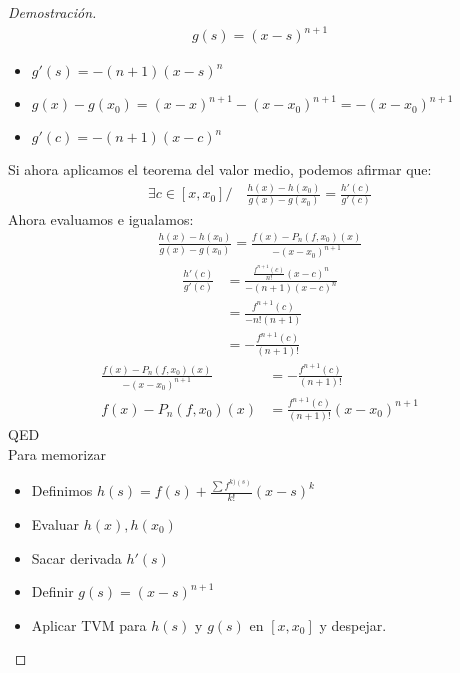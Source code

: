 \documentclass{article}
\begin{document}
\begin{proof}[Demostración]
    \begin{equation}
        \begin{split}
            g(s)= (x-s)^{n+1}
        \end{split}
    \end{equation}
    \begin{itemize}
        \item $g'(s)=-(n+1)(x-s)^{n}$
        \item $g(x) -g(x_{0})= (x-x)^{n+1} - (x-x_{0})^{n+1}= - (x-x_{0})^{n+1}$
        \item $g'(c)= -(n+1)(x-c)^{n}$
    \end{itemize}
    Si ahora aplicamos el teorema del valor medio, podemos afirmar que:
    \begin{equation}
        \begin{split}
            \exists c \in [x,x_{0}] / \quad \frac{h(x)-h(x_{0})}{g(x)-g(x_{0})} = \frac{h'(c)}{g'(c)}
        \end{split}
    \end{equation}
    Ahora evaluamos e igualamos:
    \begin{equation}
        \begin{split}
            \frac{h(x)-h(x_{0})}{g(x)-g(x_{0})} = \frac{f(x)- P_{n}(f,x_{0})(x)}{-(x-x_{0})^{n+1}}
        \end{split}
    \end{equation}
    \begin{equation}
        \begin{split}
            \frac{h'(c)}{g'(c)} &= \frac{\frac{f^{n+1}(c)}{n!}(x-c)^{n}}{-(n+1)(x-c)^{n}}\\
            &= \frac{f^{n+1}(c)}{-n!(n+1)} \\
            &= -\frac{f^{n+1}(c)}{(n+1)!}
        \end{split}
    \end{equation}
    \begin{equation}
        \begin{split}
            \frac{f(x)- P_{n}(f,x_{0})(x)}{-(x-x_{0})^{n+1}} &= -\frac{f^{n+1}(c)}{(n+1)!}\\
            f(x)- P_{n}(f,x_{0})(x) &= \frac{f^{n+1}(c)}{(n+1)!}(x-x_{0})^{n+1}
        \end{split}
    \end{equation}
    QED\\
Para memorizar
\begin{itemize}
	\item Definimos \(h(s) = f(s) + \frac{\sum f^{k)(s)}}{k!}(x-s)^{k}\)
	\item Evaluar \(h(x), h(x_0)\)
	\item Sacar derivada \(h'(s)\)
	\item Definir \(g(s)=(x-s)^{n+1}\)
	\item Aplicar TVM para \(h(s)\) y \(g(s)\) en \([x,x_0]\) y despejar.  
\end{itemize}
\end{proof}
\end{document}
